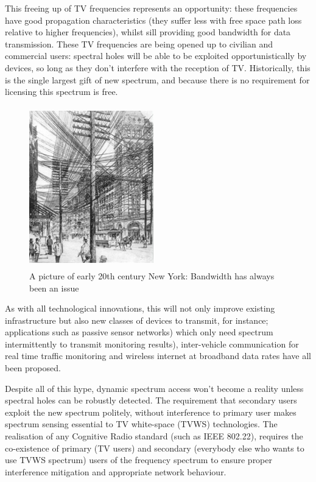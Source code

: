 \documentclass[conference]{IEEEtran}
\begin{document}
This freeing up of TV frequencies represents an opportunity: these frequencies have good propagation characteristics (they suffer less with free space path loss relative to higher frequencies), whilst sill providing good bandwidth for data transmission. These TV frequencies are being opened up to civilian and  commercial users: spectral holes will be able to be exploited opportunistically by devices, so long as they don't interfere with the reception of TV. Historically, this is the single largest gift of new spectrum, and because there is no requirement for licensing this spectrum is free.

\begin{figure}
\centering
\includegraphics[width=0.48\textwidth, height = 7cm]{cablesnewyork.jpg}
\caption{A picture of early 20th century New York: Bandwidth has always been an issue}
\label{newyork}
\end{figure}

As with all technological innovations, this will not only improve existing infrastructure but also new classes of devices to transmit, for instance; applications such as passive sensor networks) which only need spectrum intermittently to transmit monitoring results), inter-vehicle communication for real time traffic monitoring and wireless internet at broadband data rates have all been proposed.

Despite all of this hype, dynamic spectrum access won't become a reality unless spectral holes can be robustly detected. The requirement that secondary users exploit the new spectrum politely, without interference to primary user makes spectrum sensing essential to TV white-space (TVWS) technologies. The realisation of any Cognitive Radio standard (such as IEEE 802.22), requires the co-existence of primary (TV users) and secondary (everybody else who wants to use TVWS spectrum) users of the frequency spectrum to ensure proper interference mitigation and appropriate network behaviour. 
\end{document}
